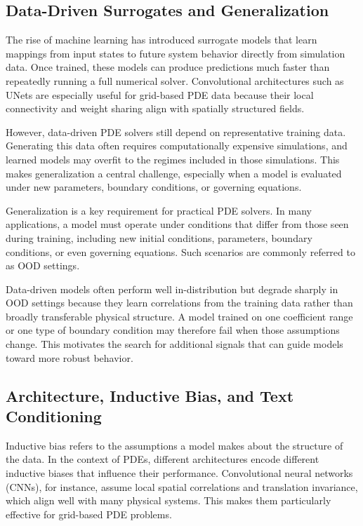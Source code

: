 \documentclass[
]{article}
\begin{document}
\subsection{Data-Driven Surrogates and
Generalization}\label{data-driven-surrogates-and-generalization}

The rise of machine learning has introduced surrogate models that learn
mappings from input states to future system behavior directly from
simulation data. Once trained, these models can produce predictions much
faster than repeatedly running a full numerical solver. Convolutional
architectures such as UNets are especially useful for grid-based PDE
data because their local connectivity and weight sharing align with
spatially structured fields.

However, data-driven PDE solvers still depend on representative training
data. Generating this data often requires computationally expensive
simulations, and learned models may overfit to the regimes included in
those simulations. This makes generalization a central challenge,
especially when a model is evaluated under new parameters, boundary
conditions, or governing equations.

Generalization is a key requirement for practical PDE solvers. In many
applications, a model must operate under conditions that differ from
those seen during training, including new initial conditions,
parameters, boundary conditions, or even governing equations. Such
scenarios are commonly referred to as OOD settings.

Data-driven models often perform well in-distribution but degrade
sharply in OOD settings because they learn correlations from the
training data rather than broadly transferable physical structure. A
model trained on one coefficient range or one type of boundary condition
may therefore fail when those assumptions change. This motivates the
search for additional signals that can guide models toward more robust
behavior.

\subsection{Architecture, Inductive Bias, and Text
Conditioning}\label{architecture-inductive-bias-and-text-conditioning}

Inductive bias refers to the assumptions a model makes about the
structure of the data. In the context of PDEs, different architectures
encode different inductive biases that influence their performance.
Convolutional neural networks (CNNs), for instance, assume local spatial
correlations and translation invariance, which align well with many
physical systems. This makes them particularly effective for grid-based
PDE problems.
\end{document}
